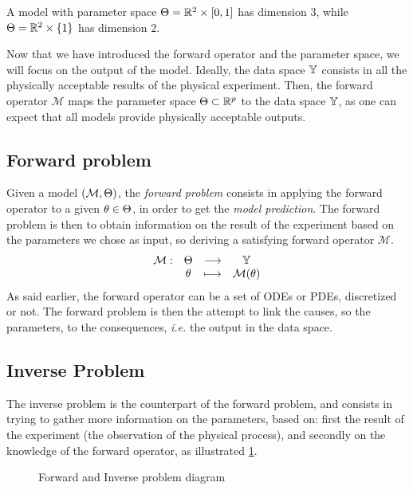\documentclass[../../Main_ManuscritThese.tex]{subfiles}
\newcommand\imgpath{/home/victor/acadwriting/Manuscrit/Text/Chapter2/img/}
\begin{document}
\begin{example}
  A model with parameter space $\Kspace = \mathbb{R}^2\times \interval{0}{1}$ has dimension $3$, while $\Theta = \mathbb{R}^2 \times \{1\}$ has dimension $2$.
\end{example}
Now that we have introduced the forward operator and the parameter
space, we will focus on the output of the model.  Ideally, the data
space $\mathbb{Y}$ consists in all the physically acceptable results of
the physical experiment.  Then, the forward operator $\mathcal{M}$
maps the parameter space $\Theta \subset \mathbb{R}^{p}$ to the data
space $\mathbb{Y}$, as one can expect that all models provide physically
acceptable outputs.

\subsection{Forward problem}
Given a model $(\mathcal{M}, \Theta)$, the \emph{forward problem}
consists in applying the forward operator to a given
$\theta \in \Theta$, in order to get the \emph{model prediction}. The
forward problem is then to obtain information on the result of the
experiment based on the parameters we chose as input, so deriving a
satisfying forward operator $\mathcal{M}$.
\begin{equation}
  \begin{array}{cccc}
    \mathcal{M}:& \Theta &\longrightarrow & \mathbb{Y} \\
                & \theta &\longmapsto     & \mathcal{M}(\theta)
  \end{array}
\end{equation}
As said earlier, the forward operator can be a set of ODEs or PDEs,
discretized or not. The forward problem is then the attempt to link
the causes, so the parameters, to the consequences, \emph{i.e.} the
output in the data space.

\subsection{Inverse Problem}
The inverse problem is the counterpart of the forward problem, and
consists in trying to gather more information on the parameters, based
on: first the result of the experiment (the observation of the physical
process), and secondly on the knowledge of the forward operator, as illustrated
\cref{fig:inv_problem_pple}.

\begin{figure}[ht]
  \centering
  
  \caption{Forward and Inverse problem diagram}
  \label{fig:inv_problem_pple}
\end{figure}
\end{document}
